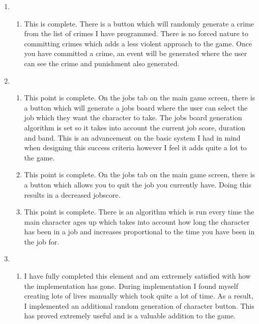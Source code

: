 \begin{enumerate}
\begin{enumerate}
            \item This is not complete due to time constraints; however the code for adopted children would\textquotesingle ve been extremely similar to that of the partner generation and the code for a newborn born baby would be extremely similar to that of creating the main character for the first time.
        \end{enumerate}
        \item \begin{enumerate}
            \item This is complete. There is a button which will randomly generate a crime from the list of crimes I have programmed. There is no forced nature to committing crimes which adds a less violent approach to the game. Once you have committed a crime, an event will be generated where the user can see the crime and punishment also generated.
        \end{enumerate}
        \item \begin{enumerate}
            \item This point is complete. On the jobs tab on the main game screen, there is a button which will generate a jobs board where the user can select the job which they want the character to take. The jobs board generation algorithm is set so it takes into account the current job score, duration and band. This is an advancement on the basic system I had in mind when designing this success criteria however I feel it adds quite a lot to the game.
            \item This point is complete. On the jobs tab on the main game screen, there is a button which allows you to quit the job you currently have. Doing this results in a decreased jobscore.
            \item This point is complete. There is an algorithm which is run every time the main character ages up which takes into account how long the character has been in a job and increases proportional to the time you have been in the job for.
        \end{enumerate}
        \item \begin{enumerate}
            \item I have fully completed this element and am extremely satisfied with how the implementation has gone. During implementation I found myself creating lots of lives manually which took quite a lot of time. As a result, I implemented an additional random generation of character button. This has proved extremely useful and is a valuable addition to the game.

\end{enumerate}
\end{enumerate}
